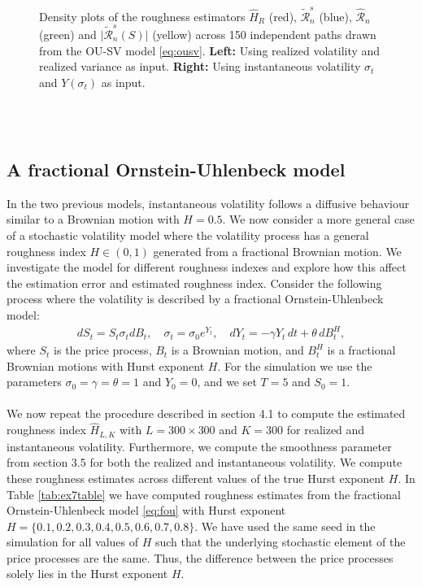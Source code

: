 \documentclass{article}
\begin{document}
\begin{figure}[htbp]
    \caption{Density plots of the roughness estimators $\widehat{H}_R$ (red), $\widetilde{\mathscr{R}}_n^s$ (blue), $\widehat{\mathscr{R}}_n$ (green) and $\lvert \widetilde{\mathscr{R}}_n^s (S)\rvert$ (yellow) across 150 independent paths drawn from the OU-SV model \eqref{eq:ousv}. \textbf{Left:} Using realized volatility and realized variance as input. \textbf{Right:} Using instantaneous volatility $\sigma_t$ and $Y(\sigma_t)$ as input.}
    \label{fig:ex6dens}
\end{figure}\\\\
\subsection{A fractional Ornstein-Uhlenbeck model}
In the two previous models, instantaneous volatility follows a diffusive behaviour similar to a Brownian motion with $H=0.5$. We now consider a more general case of a stochastic volatility model where the volatility process has a general roughness index $H\in(0,1)$ generated from a fractional Brownian motion. We investigate the model for different roughness indexes and explore how this affect the estimation error and estimated roughness index. Consider the following process where the volatility is described by a fractional Ornstein-Uhlenbeck model:
\begin{align}
dS_t = S_t \sigma_t dB_t, \quad \sigma_t = \sigma_0 e^{Y_t}, \quad dY_t = -\gamma Y_t \, dt + \theta \, dB^H_t, \label{eq:fou}
\end{align}
where $S_t$ is the price process, $B_t$ is a Brownian motion, and $B_t^H$ is a fractional Brownian motions with Hurst exponent $H$. For the simulation we use the parameters $\sigma_0 =\gamma=\theta=1$ and $Y_0=0$, and we set $T=5$ and $S_0=1$.\\\\
We now repeat the procedure described in section 4.1 to compute the estimated roughness index $\hat{H}_{L,K}$ with $L=300\times 300$ and $K=300$ for realized and instantaneous volatility. Furthermore, we compute the smoothness parameter from section 3.5 for both the realized and instantaneous volatility. We compute these roughness estimates across different values of the true Hurst exponent $H$. In Table \ref{tab:ex7table} we have computed roughness estimates from the fractional Ornstein-Uhlenbeck model \eqref{eq:fou} with Hurst exponent $H=\{0.1,0.2,0.3,0.4,0.5,0.6,0.7,0.8\}$. We have used the same seed in the simulation for all values of $H$ such that the underlying stochastic element of the price processes are the same. Thus, the difference between the price processes solely lies in the Hurst exponent $H$.
\end{document}
